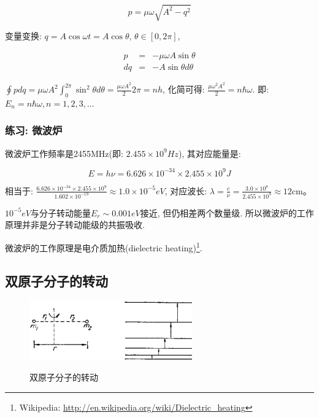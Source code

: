 \begin{equation*}
p = \mu \omega \sqrt{A^2 - q^2}
\end{equation*}

变量变换: $q = A\cos \omega t = A \cos \theta$, $\theta \in [0,
2\pi]$,

\begin{eqnarray*}
p &=& - \mu \omega A \sin \theta \\
dq &=& -A \sin \theta d \theta
\end{eqnarray*}


$\oint p dq =\mu \omega A^2 \int_0^{2\pi} \sin^2 \theta d \theta =
\frac{\mu \omega A^2}{2} 2\pi = n h$, 化简可得: $\frac{\mu \omega^2
A^2}{2} = n\hbar \omega$. 即: $E_n = n \hbar \omega, n = 1,2,3,...$

\subsubsection*{练习: 微波炉}

微波炉工作频率是2455MHz(即: $2.455 \times 10^9 Hz$), 其对应能量是:

\begin{equation*}
E = h \nu = 6.626 \times 10^{-34} \times 2.455 \times 10^9 J
\end{equation*}

相当于: $\frac{6.626 \times 10^{-34} \times 2.455 \times 10^9}{1.602
\times 10^{-19}} \approx 1.0 \times 10^{-5}eV$, 对应波长: $\lambda =
\frac{c}{\nu} = \frac{3.0 \times 10^8}{2.455 \times 10^9} \approx 12
\text{cm}$。

$10^{-5}eV$与分子转动能量$E_r \sim 0.001eV$接近, 但仍相差两个数量级.
所以微波炉的工作原理并非是分子转动能级的共振吸收.

微波炉的工作原理是电介质加热(dielectric heating)\footnote{Wikipedia:
\url{http://en.wikipedia.org/wiki/Dielectric_heating}}.



\subsection{双原子分子的转动}

\begin{figure}[h]
\begin{center}
  \includegraphics[width=7cm]{Spectrum/mo_rotation.ps}\\
  \caption{双原子分子的转动}\label{rotation of di-molecule}
\end{center}
\end{figure}


